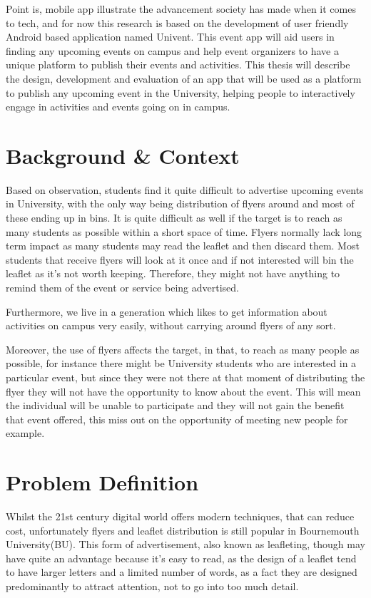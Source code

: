 Point is, mobile app illustrate the advancement society has made when it comes to tech, and for now this research is based on the development of user friendly Android based application named Univent. This event app will aid users in finding any upcoming events on campus and help event organizers to have a unique platform to publish their events and activities.
This thesis will describe the design, development and evaluation of an app that will be used as a platform to publish any upcoming event in the University, helping people to interactively engage in activities and events going on in campus.

\section{Background \& Context}
Based on observation, students find it quite difficult to advertise upcoming events in University, with the only way being distribution of flyers around and most of these ending up in bins. It is quite difficult as well if the target is to reach as many students as possible within a short space of time. Flyers normally lack long term impact as many students may read the leaflet and then discard them. Most students that receive flyers will look at it once and if not interested will bin the leaflet as it's not worth keeping. Therefore, they might not have anything to remind them of the event or service being advertised.
 
Furthermore, we live in a generation which likes to get information about activities on campus very easily, without carrying around flyers of any sort. 

Moreover, the use of flyers affects the target, in that, to reach as many people as possible, for instance there might be University students who are interested in a particular event, but since they were not there at that moment of distributing the flyer they will not have the opportunity to know about the event. This will mean the individual will be unable to participate and they will not gain the benefit that event offered, this miss out on the opportunity of meeting new people for example.

\section{Problem Definition}
\label{prob_def}
Whilst the 21st century digital world offers modern techniques, that can reduce cost, unfortunately flyers and leaflet distribution is still popular in Bournemouth University(BU). This form of advertisement, also known as leafleting, though may have quite an advantage because it’s easy to read, as the design of a leaflet tend to have larger letters and a limited number of words, as a fact they are designed predominantly to attract attention, not to go into too much detail.

